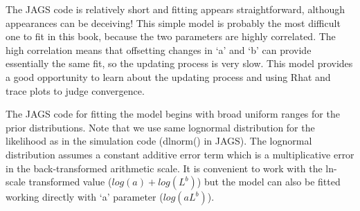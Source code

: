 \documentclass[
]{krantz}
\begin{document}
The JAGS code is relatively short and fitting appears straightforward, although appearances can be deceiving! This simple model is probably the most difficult one to fit in this book, because the two parameters are highly correlated. The high correlation means that offsetting changes in `a' and `b' can provide essentially the same fit, so the updating process is very slow. This model provides a good opportunity to learn about the updating process and using Rhat and trace plots to judge convergence.

The JAGS code for fitting the model begins with broad uniform ranges for the prior distributions. Note that we use same lognormal distribution for the likelihood as in the simulation code (dlnorm() in JAGS). The lognormal distribution assumes a constant additive error term which is a multiplicative error in the back-transformed arithmetic scale. It is convenient to work with the ln-scale transformed value (\(log(a)+log(L^b)\)) but the model can also be fitted working directly with `a' parameter (\(log(aL^b)\)).
\end{document}
